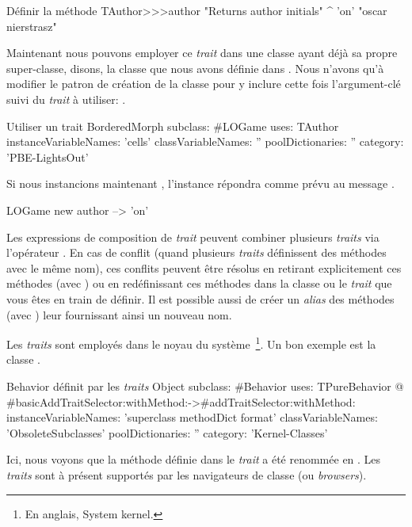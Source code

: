 \documentclass[a4paper,10pt,twoside]{book}
\begin{document}
\begin{method}[author]{Définir la méthode }
TAuthor>>>author
    "Returns author initials"
	^ 'on'    "oscar nierstrasz"
\end{method}

\noindent
Maintenant nous pouvons employer ce \emph{trait} dans une classe ayant déjà sa propre super-classe, disons, la classe  que nous avons définie dans .
Nous n'avons qu'à modifier le patron de création de la classe  pour y inclure cette fois l'argument-clé  suivi du \emph{trait} à utiliser: .

\begin{classdef}[sbegamewithtrait]{Utiliser un trait}
BorderedMorph subclass: #LOGame
	uses: TAuthor
	instanceVariableNames: 'cells'
	classVariableNames: ''
	poolDictionaries: ''
	category: 'PBE-LightsOut'
\end{classdef}

Si nous instancions maintenant , l'instance répondra comme prévu au message .

\begin{code}{}
LOGame new author --> 'on'
\end{code}

Les expressions de composition de \emph{trait} peuvent combiner plusieurs \emph{traits} via l'opérateur \ct{+}.
En cas de conflit (\ie quand plusieurs \emph{traits} définissent des méthodes avec le même nom), ces conflits peuvent être résolus en retirant explicitement ces méthodes (avec \ct{-}) ou en redéfinissant ces méthodes dans la classe ou le \emph{trait} que vous êtes en train de définir.
Il est possible aussi de créer un \emph{alias} des méthodes (avec ) 
leur fournissant ainsi un nouveau nom.

Les \emph{traits} sont employés dans le noyau du système~\footnote{En anglais, System kernel.}.
Un bon exemple est la classe \mbox{.}

\begin{classdef}[behaviorwithtraits]{Behavior définit par les \emph{traits}}
Object subclass: #Behavior
	uses: TPureBehavior @ {#basicAddTraitSelector:withMethod:->#addTraitSelector:withMethod:}
	instanceVariableNames: 'superclass methodDict format'
	classVariableNames: 'ObsoleteSubclasses'
	poolDictionaries: ''
	category: 'Kernel-Classes'
\end{classdef}
\noindent
Ici, nous voyons que la méthode  définie dans le \emph{trait}  a été renommée en \mbox{.}
Les \emph{traits} sont à présent supportés par les navigateurs de classe (ou \emph{browsers}).
\end{document}
